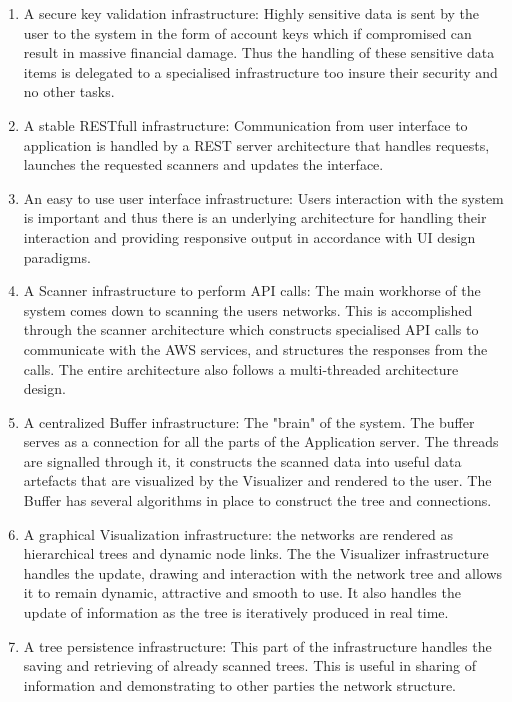 \documentclass[hidelinks,a4paper,12pt]{article}
\begin{document}
\begin{enumerate} 
\item A secure key validation infrastructure: Highly sensitive data is sent by the user to the system in the form of account keys which if compromised can result in massive financial damage. Thus the handling of these sensitive data items is delegated to a specialised infrastructure too insure their security and no other tasks.
\item A stable RESTfull infrastructure: Communication from user interface to application is handled by a REST server architecture that handles requests, launches the requested scanners and updates the interface.
\item An easy to use user interface infrastructure: Users interaction with the system is important and thus there is an underlying architecture for handling their interaction and providing responsive output in accordance with UI design paradigms.
\item A Scanner infrastructure to perform API calls: The main workhorse of the system comes down to scanning the users networks. This is accomplished through the scanner architecture which constructs specialised API calls to communicate with the AWS services, and structures the responses from the calls. The entire architecture also follows a multi-threaded architecture design.
\item A centralized Buffer infrastructure: The "brain" of the system. The buffer serves as a connection for all the parts of the Application server. The threads are signalled through it, it constructs the scanned data into useful data artefacts that are visualized by the Visualizer and rendered to the user. The Buffer has several algorithms in place to construct the tree and connections.
\item A graphical Visualization infrastructure: the networks are rendered as hierarchical trees and dynamic node links. The the Visualizer infrastructure handles the update, drawing and interaction with the network tree and allows it to remain dynamic, attractive and smooth to use. It also handles the update of information as the tree is iteratively produced in real time.
\item A tree persistence infrastructure: This part of the infrastructure handles the saving and retrieving of already scanned trees. This is useful in sharing of information and demonstrating to other parties the network structure.




\end{enumerate} 
\end{document}
